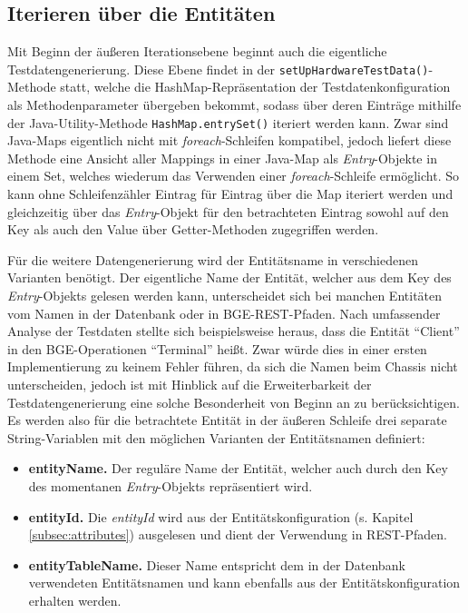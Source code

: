 \subsection{Iterieren über die Entitäten}\label{subsec:iterationEntities}
Mit Beginn der äußeren Iterationsebene beginnt auch die eigentliche Testdatengenerierung. Diese Ebene findet in der \colorbox{background}{\lstinline{setUpHardwareTestData()}}-Methode statt, welche die HashMap-Repräsentation der Testdatenkonfiguration als Methodenparameter übergeben bekommt, sodass über deren Einträge mithilfe der Java-Utility-Methode \colorbox{background}{\lstinline{HashMap.entrySet()}} iteriert werden kann. Zwar sind Java-Maps eigentlich nicht mit \textit{foreach}-Schleifen kompatibel, jedoch liefert diese Methode eine Ansicht aller Mappings in einer Java-Map als \textit{Entry}-Objekte in einem Set, welches wiederum das Verwenden einer \textit{foreach}-Schleife ermöglicht. So kann ohne Schleifenzähler Eintrag für Eintrag über die Map iteriert werden und gleichzeitig über das \textit{Entry}-Objekt für den betrachteten Eintrag sowohl auf den Key als auch den Value über Getter-Methoden zugegriffen werden.

Für die weitere Datengenerierung wird der Entitätsname in verschiedenen Varianten benötigt. Der eigentliche Name der Entität, welcher aus dem Key des \textit{Entry}-Objekts gelesen werden kann, unterscheidet sich bei manchen Entitäten vom Namen in der Datenbank oder in \ac{BGE}-\ac{REST}-Pfaden. Nach umfassender Analyse der Testdaten stellte sich beispielsweise heraus, dass die Entität \enquote{Client} in den \ac{BGE}-Operationen \enquote{Terminal} heißt. Zwar würde dies in einer ersten Implementierung zu keinem Fehler führen, da sich die Namen beim Chassis nicht unterscheiden, jedoch ist mit Hinblick auf die Erweiterbarkeit der Testdatengenerierung eine solche Besonderheit von Beginn an zu berücksichtigen. Es werden also für die betrachtete Entität in der äußeren Schleife drei separate String-Variablen mit den möglichen Varianten der Entitätsnamen definiert:

\begin{itemize}
    \item \textbf{entityName.} Der reguläre Name der Entität, welcher auch durch den Key des momentanen \textit{Entry}-Objekts repräsentiert wird.
    \item \textbf{entityId.} Die \textit{entityId} wird aus der Entitätskonfiguration (s. Kapitel \ref{subsec:attributes}) ausgelesen und dient der Verwendung in \ac{REST}-Pfaden.
    \item \textbf{entityTableName.} Dieser Name entspricht dem in der Datenbank verwendeten Entitätsnamen und kann ebenfalls aus der Entitätskonfiguration erhalten werden.
\end{itemize}

